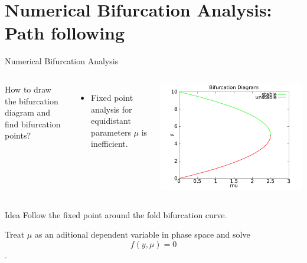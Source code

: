 \documentclass{beamer}
\begin{document}
\section{Numerical Bifurcation Analysis: Path following}
\begin{frame}{Numerical Bifurcation Analysis}
    \begin{columns}
        \begin{block}{}
            How to draw the bifurcation diagram and find bifurcation points?
        \end{block}
        \begin{itemize}
            \item Fixed point analysis for equidistant parameters $\mu$ is inefficient.
        \end{itemize}
        \includegraphics[width=\textwidth]{grafik/harvesting}
    \end{columns}
    
    \pause
    \begin{block}{Idea}
        Follow the fixed point around the fold bifurcation curve.
    \end{block}
    
    Treat $\mu$ as an aditional dependent variable in phase space and solve 
    $$f(y, \mu) = 0$$. 
    
\end{frame}
\end{document}
